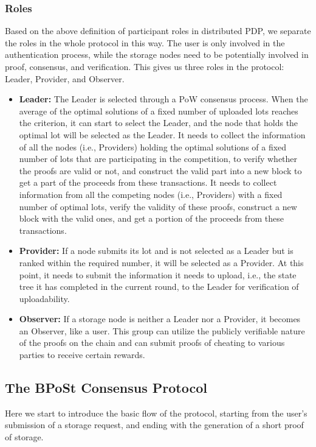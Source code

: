 \documentclass[journal]{IEEEtran}
\begin{document}
\subsubsection{Roles}
Based on the above definition of participant roles in distributed PDP, we separate the roles in the whole protocol in this way. The user is only involved in the authentication process, while the storage nodes need to be potentially involved in proof, consensus, and verification. This gives us three roles in the protocol: Leader, Provider, and Observer.
\begin{itemize}
    \item \textbf{Leader: }
    The Leader is selected through a PoW consensus process. When the average of the optimal solutions of a fixed number of uploaded lots reaches the criterion, it can start to select the Leader, and the node that holds the optimal lot will be selected as the Leader. It needs to collect the information of all the nodes (i.e., Providers) holding the optimal solutions of a fixed number of lots that are participating in the competition, to verify whether the proofs are valid or not, and construct the valid part into a new block to get a part of the proceeds from these transactions. It needs to collect information from all the competing nodes (i.e., Providers) with a fixed number of optimal lots, verify the validity of these proofs, construct a new block with the valid ones, and get a portion of the proceeds from these transactions.
    \item \textbf{Provider: }
    If a node submits its lot and is not selected as a Leader but is ranked within the required number, it will be selected as a Provider. At this point, it needs to submit the information it needs to upload, i.e., the state tree it has completed in the current round, to the Leader for verification of uploadability.
    \item \textbf{Observer: }
    If a storage node is neither a Leader nor a Provider, it becomes an Observer, like a user. This group can utilize the publicly verifiable nature of the proofs on the chain and can submit proofs of cheating to various parties to receive certain rewards.
\end{itemize}


\subsection{The BPoSt Consensus Protocol}
Here we start to introduce the basic flow of the protocol, starting from the user's submission of a storage request, and ending with the generation of a short proof of storage.
\end{document}

